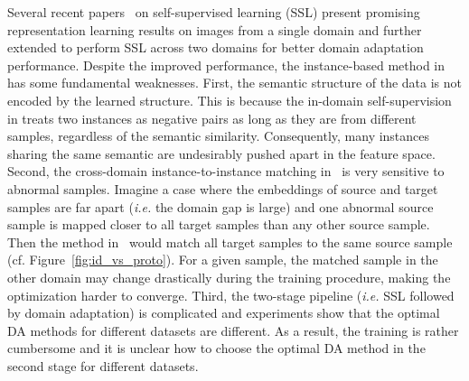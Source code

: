 \documentclass[final]{cvpr}
\begin{document}
Several recent papers~\cite{he2020momentum,chen2020simple,grill2020bootstrap, oord2018representation, wu2018unsupervised} on self-supervised learning (SSL) present promising representation learning results on images from a single domain and \cite{kim2020cross} further extended to perform SSL across two domains for better domain adaptation performance. Despite the improved performance, the instance-based method in~\cite{kim2020cross} has some fundamental weaknesses. First, the semantic structure of the data is not encoded by the learned structure. This is because the in-domain self-supervision in \cite{kim2020cross} treats two instances as negative pairs as long as they are from different samples, regardless of the semantic similarity. Consequently, many instances sharing the same semantic are undesirably pushed apart in the feature space. Second, the cross-domain instance-to-instance matching in~\cite{kim2020cross} is very sensitive to abnormal samples. Imagine a case where the embeddings of source and target samples are far apart (\textit{i.e.} the domain gap is large) and one abnormal source sample is mapped closer to all target samples than any other source sample. Then the method in~\cite{kim2020cross} would match all target samples to the same source sample (cf. Figure~\ref{fig:id_vs_proto}). For a given sample, the matched sample in the other domain may change drastically during the training procedure, making the optimization harder to converge. Third, the two-stage pipeline (\textit{i.e.} SSL followed by domain adaptation) is complicated and experiments show that the optimal DA methods for different datasets are different. As a result, the training is rather cumbersome and it is unclear how to choose the optimal DA method in the second stage for different datasets.
\end{document}
